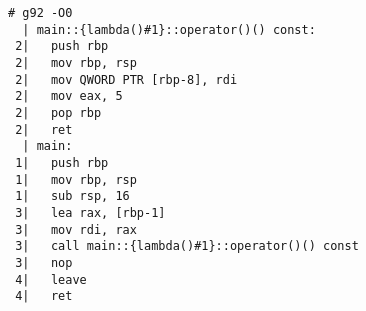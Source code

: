 \begin{lstlisting}[language={},numbers=none,title=\href{https://godbolt.org/z/DrnSSE}{\texttt{godbolt.org/z/DrnSSE}}]
# g92 -O0
  | main::{lambda()#1}::operator()() const:
 2|   push rbp
 2|   mov rbp, rsp
 2|   mov QWORD PTR [rbp-8], rdi
 2|   mov eax, 5
 2|   pop rbp
 2|   ret
  | main:
 1|   push rbp
 1|   mov rbp, rsp
 1|   sub rsp, 16
 3|   lea rax, [rbp-1]
 3|   mov rdi, rax
 3|   call main::{lambda()#1}::operator()() const
 3|   nop
 4|   leave
 4|   ret
\end{lstlisting}
